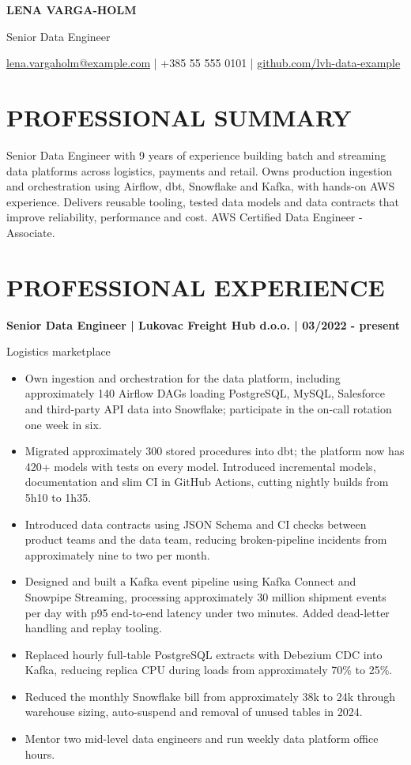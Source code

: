 \documentclass[11pt,a4paper]{article}
\newcommand{\cvsection}[1]{\section*{#1}}
\begin{document}
{\LARGE\bfseries\color{primarycolor} LENA VARGA-HOLM}\par
{\large\color{accentcolor} Senior Data Engineer}\par
{\small \href{mailto:lena.vargaholm@example.com}{lena.vargaholm@example.com} | +385 55 555 0101 | \href{https://github.com/lvh-data-example}{github.com/lvh-data-example}}\par
\cvsection{PROFESSIONAL SUMMARY}
Senior Data Engineer with 9 years of experience building batch and streaming data platforms across logistics, payments and retail. Owns production ingestion and orchestration using Airflow, dbt, Snowflake and Kafka, with hands-on AWS experience. Delivers reusable tooling, tested data models and data contracts that improve reliability, performance and cost. AWS Certified Data Engineer - Associate.
\cvsection{PROFESSIONAL EXPERIENCE}
\textbf{Senior Data Engineer | Lukovac Freight Hub d.o.o. | 03/2022 - present}\par
Logistics marketplace
\begin{itemize}
\item Own ingestion and orchestration for the data platform, including approximately 140 Airflow DAGs loading PostgreSQL, MySQL, Salesforce and third-party API data into Snowflake; participate in the on-call rotation one week in six.
\item Migrated approximately 300 stored procedures into dbt; the platform now has 420+ models with tests on every model. Introduced incremental models, documentation and slim CI in GitHub Actions, cutting nightly builds from 5h10 to 1h35.
\item Introduced data contracts using JSON Schema and CI checks between product teams and the data team, reducing broken-pipeline incidents from approximately nine to two per month.
\item Designed and built a Kafka event pipeline using Kafka Connect and Snowpipe Streaming, processing approximately 30 million shipment events per day with p95 end-to-end latency under two minutes. Added dead-letter handling and replay tooling.
\item Replaced hourly full-table PostgreSQL extracts with Debezium CDC into Kafka, reducing replica CPU during loads from approximately 70\% to 25\%.
\item Reduced the monthly Snowflake bill from approximately 38k to 24k through warehouse sizing, auto-suspend and removal of unused tables in 2024.
\item Mentor two mid-level data engineers and run weekly data platform office hours.
\end{itemize}
\end{document}
